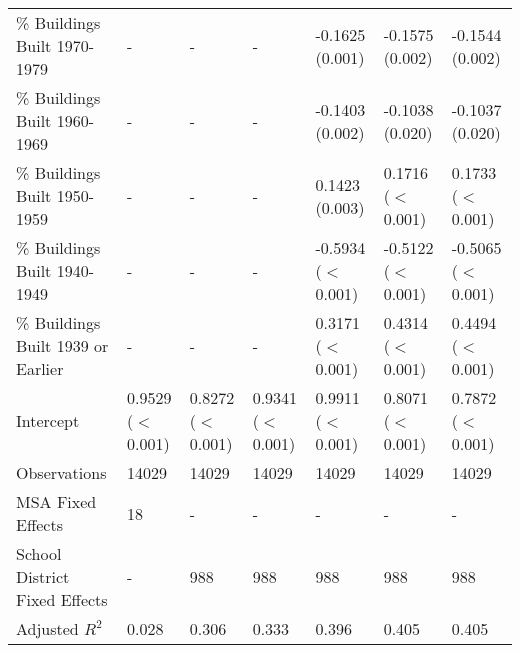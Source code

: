 \begin{landscape}
\begin{table}[h]
\begin{tabular}{l|llllll}
\% Buildings Built 1970-1979 &- & - & - & -0.1625 (0.001) & -0.1575 (0.002) & -0.1544 (0.002) \\
\% Buildings Built 1960-1969 &- & - & - & -0.1403 (0.002) & -0.1038 (0.020) & -0.1037 (0.020) \\
\% Buildings Built 1950-1959 &- & - & - & 0.1423 (0.003) & 0.1716 ($<$0.001) & 0.1733 ($<$0.001) \\
\% Buildings Built 1940-1949 &- & - & - & -0.5934 ($<$0.001) & -0.5122 ($<$0.001) & -0.5065 ($<$0.001) \\
\% Buildings Built 1939 or Earlier &- & - & - & 0.3171 ($<$0.001) & 0.4314 ($<$0.001) & 0.4494 ($<$0.001) \\
Intercept &0.9529 ($<$0.001) & 0.8272 ($<$0.001) & 0.9341 ($<$0.001) & 0.9911 ($<$0.001) & 0.8071 ($<$0.001) & 0.7872 ($<$0.001) \\
Observations &14029 & 14029 & 14029 & 14029 & 14029 & 14029 \\
MSA Fixed Effects &18 & - & - & - & - & - \\
School District Fixed Effects &- & 988 & 988 & 988 & 988 & 988 \\
Adjusted $R^2$ &0.028 & 0.306 & 0.333 & 0.396 & 0.405 & 0.405 \\\hline
\end{tabular}
\end{table}
\newpage
\end{landscape}
\restoregeometry
